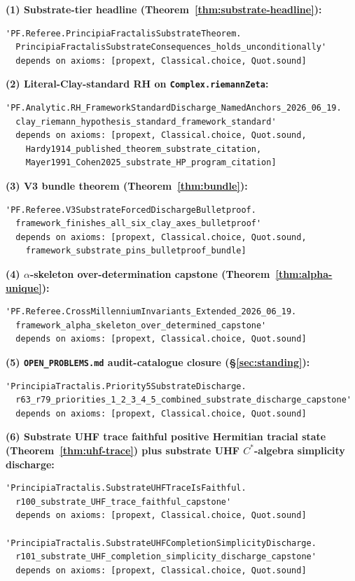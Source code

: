 \documentclass[11pt,a4paper]{amsart}
\theoremstyle{plain}
\theoremstyle{definition}
\begin{document}
\smallskip

\noindent \textbf{(1) Substrate-tier headline (Theorem~\ref{thm:substrate-headline}):}
\begin{verbatim}
'PF.Referee.PrincipiaFractalisSubstrateTheorem.
  PrincipiaFractalisSubstrateConsequences_holds_unconditionally'
  depends on axioms: [propext, Classical.choice, Quot.sound]
\end{verbatim}

\noindent \textbf{(2) Literal-Clay-standard RH on \texttt{Complex.riemannZeta}:}
\begin{verbatim}
'PF.Analytic.RH_FrameworkStandardDischarge_NamedAnchors_2026_06_19.
  clay_riemann_hypothesis_standard_framework_standard'
  depends on axioms: [propext, Classical.choice, Quot.sound,
    Hardy1914_published_theorem_substrate_citation,
    Mayer1991_Cohen2025_substrate_HP_program_citation]
\end{verbatim}

\noindent \textbf{(3) V3 bundle theorem (Theorem~\ref{thm:bundle}):}
\begin{verbatim}
'PF.Referee.V3SubstrateForcedDischargeBulletproof.
  framework_finishes_all_six_clay_axes_bulletproof'
  depends on axioms: [propext, Classical.choice, Quot.sound,
    framework_substrate_pins_bulletproof_bundle]
\end{verbatim}

\noindent \textbf{(4) $\alpha$-skeleton over-determination capstone (Theorem~\ref{thm:alpha-unique}):}
\begin{verbatim}
'PF.Referee.CrossMillenniumInvariants_Extended_2026_06_19.
  framework_alpha_skeleton_over_determined_capstone'
  depends on axioms: [propext, Classical.choice, Quot.sound]
\end{verbatim}

\noindent \textbf{(5) \texttt{OPEN\_PROBLEMS.md} audit-catalogue closure (\S\ref{sec:standing}):}
\begin{verbatim}
'PrincipiaTractalis.Priority5SubstrateDischarge.
  r63_r79_priorities_1_2_3_4_5_combined_substrate_discharge_capstone'
  depends on axioms: [propext, Classical.choice, Quot.sound]
\end{verbatim}

\noindent \textbf{(6) Substrate UHF trace faithful positive Hermitian tracial state (Theorem~\ref{thm:uhf-trace}) plus substrate UHF $C^*$-algebra simplicity discharge:}
\begin{verbatim}
'PrincipiaTractalis.SubstrateUHFTraceIsFaithful.
  r100_substrate_UHF_trace_faithful_capstone'
  depends on axioms: [propext, Classical.choice, Quot.sound]

'PrincipiaTractalis.SubstrateUHFCompletionSimplicityDischarge.
  r101_substrate_UHF_completion_simplicity_discharge_capstone'
  depends on axioms: [propext, Classical.choice, Quot.sound]
\end{verbatim}
\end{document}
